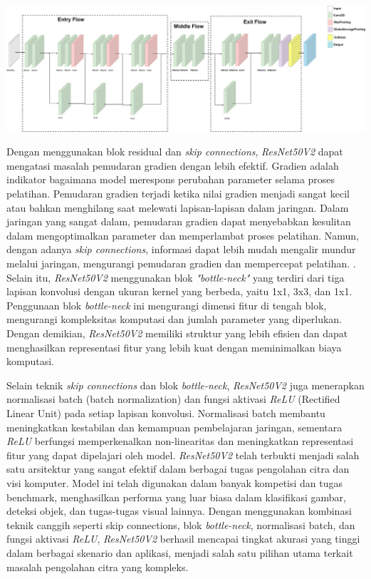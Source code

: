 \begin{center}
  \includegraphics[width=0.8\linewidth]{gambar/bener/Arsitektur_ModelCNNResNet50V2_Dasar.png}
  \label{fig:Arsitektur ResNet50V2}
\end{center}

Dengan menggunakan blok residual dan \textit{skip connections}, \textit{ResNet50V2} dapat mengatasi masalah pemudaran gradien dengan lebih efektif. Gradien adalah indikator bagaimana model merespons perubahan parameter selama proses pelatihan. Pemudaran gradien terjadi ketika nilai gradien menjadi sangat kecil atau bahkan menghilang saat melewati lapisan-lapisan dalam jaringan. Dalam jaringan yang sangat dalam, pemudaran gradien dapat menyebabkan kesulitan dalam mengoptimalkan parameter dan memperlambat proses pelatihan. Namun, dengan adanya \textit{skip connections}, informasi dapat lebih mudah mengalir mundur melalui jaringan, mengurangi pemudaran gradien dan mempercepat pelatihan. \cite{prusty2022resnet50v2} . Selain itu, \textit{ResNet50V2} menggunakan blok \textit{"bottle-neck"} yang terdiri dari tiga lapisan konvolusi dengan ukuran kernel yang berbeda, yaitu 1x1, 3x3, dan 1x1. Penggunaan blok \textit{bottle-neck} ini mengurangi dimensi fitur di tengah blok, mengurangi kompleksitas komputasi dan jumlah parameter yang diperlukan. Dengan demikian, \textit{ResNet50V2} memiliki struktur yang lebih efisien dan dapat menghasilkan representasi fitur yang lebih kuat dengan meminimalkan biaya komputasi.

Selain teknik \textit{skip connections} dan blok \textit{bottle-neck}, \textit{ResNet50V2} juga menerapkan normalisasi batch (batch normalization) dan fungsi aktivasi \textit{ReLU} (Rectified Linear Unit) pada setiap lapisan konvolusi. Normalisasi batch membantu meningkatkan kestabilan dan kemampuan pembelajaran jaringan, sementara \textit{ReLU} berfungsi memperkenalkan non-linearitas dan meningkatkan representasi fitur yang dapat dipelajari oleh model. \textit{ResNet50V2} telah terbukti menjadi salah satu arsitektur yang sangat efektif dalam berbagai tugas pengolahan citra dan visi komputer. Model ini telah digunakan dalam banyak kompetisi dan tugas benchmark, menghasilkan performa yang luar biasa dalam klasifikasi gambar, deteksi objek, dan tugas-tugas visual lainnya. Dengan menggunakan kombinasi teknik canggih seperti skip connections, blok \textit{bottle-neck}, normalisasi batch, dan fungsi aktivasi \textit{ReLU}, \textit{ResNet50V2} berhasil mencapai tingkat akurasi yang tinggi dalam berbagai skenario dan aplikasi, menjadi salah satu pilihan utama terkait masalah pengolahan citra yang kompleks.

